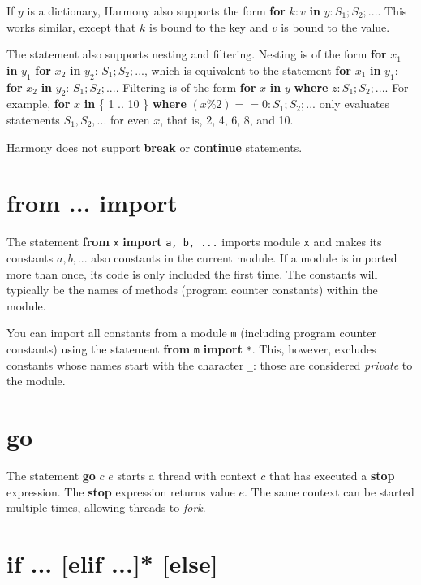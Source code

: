 \documentclass{report}
\begin{document}
If $y$ is a dictionary, Harmony also supports the form
\textbf{for} $k:v$ \textbf{in} $y: S_1; S_2; ...$.  This works similar,
except that $k$ is bound to the key and $v$ is bound to the value.

The statement also supports nesting and filtering.
Nesting is of the form
\textbf{for} $x_1$ \textbf{in} $y_1$ \textbf{for} $x_2$ \textbf{in} $y_2$:
$S_1; S_2; ...$,
which is equivalent to the statement
\textbf{for} $x_1$ \textbf{in} $y_1$: \textbf{for} $x_2$ \textbf{in} $y_2$:
$S_1; S_2; ...$.
Filtering is of the form
\textbf{for} $x$ \textbf{in} $y$ \textbf{where} $z: S_1; S_2; ...$.
For example,
\textbf{for} $x$ \textbf{in} \{ 1 .. 10 \} \textbf{where} $(x \% 2) == 0:
S_1; S_2; ...$ only evaluates statements $S_1, S_2, ...$ for even $x$,
that is, 2, 4, 6, 8, and 10.

Harmony does not support \textbf{break} or \textbf{continue} statements.

\section{\textbf{from ... import}}

The statement \textbf{from} \texttt{x} \textbf{import} \texttt{a, b, ...}
imports module \texttt{x} and makes its constants $a, b, ...$ also constants
in the current module.  If a module is imported more than once, its code
is only included the first time.  The constants will typically be the
names of methods (program counter constants) within the module.

You can import all constants from a module \texttt{m}
(including program counter constants) using the statement
\textbf{from} \texttt{m} \textbf{import} \texttt{*}.
This, however, excludes constants whose names start with the character
\texttt{\_}: those are considered \emph{private} to the module.

\section{\textbf{go}}

The statement \textbf{go} $c$ $e$ starts a thread with context $c$ that
has executed a \textbf{stop} expression.  The \textbf{stop} expression
returns value $e$.
The same context can be started multiple times, allowing threads to
\emph{fork}.

\section{\textbf{if ... [elif ...]* [else]}}
\end{document}
